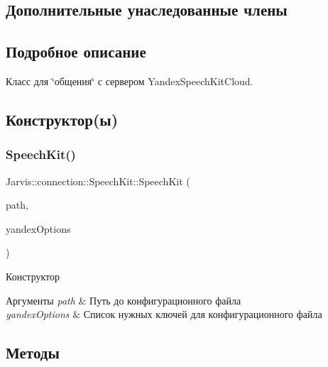 \subsection*{Дополнительные унаследованные члены}


\subsection{Подробное описание}
Класс для \char`\"{}общения\char`\"{} с сервером Yandex\+Speech\+Kit\+Cloud. 

\subsection{Конструктор(ы)}
\mbox{\label{classJarvis_1_1connection_1_1SpeechKit_a814a5553551a585b66a7e72c99b3522f}} 
\subsubsection{\texorpdfstring{Speech\+Kit()}{SpeechKit()}}
{\footnotesize\ttfamily Jarvis\+::connection\+::\+Speech\+Kit\+::\+Speech\+Kit (\begin{DoxyParamCaption}\item[{const Transport\+::j\+Path \&}]{path,  }\item[{const Transport\+::\+Options\+List\+::yandex\+Options}]{yandex\+Options }\end{DoxyParamCaption})}



Конструктор 


\begin{DoxyParams}{Аргументы}
{\em path} & Путь до конфигурационного файла \\
\hline
{\em yandex\+Options} & Список нужных ключей для конфигурационного файла \\
\hline
\end{DoxyParams}


\subsection{Методы}
\mbox{\label{classJarvis_1_1connection_1_1SpeechKit_af213e0c8c3f6bb8a1776f6f21c859713}} 
